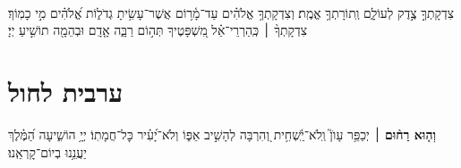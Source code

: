 \documentclass[twoside, openany, parskip=half, 11pt]{book}
\begin{document}
\tachanunim

\\
צִדְקָתְךָ֣ צֶ֣דֶק לְעוֹלָ֑ם וְֽתוֹרָתְךָ֥ אֱמֶֽת׃ וְצִדְקָתְךָ֥ אֱלֹהִ֗ים עַד־מָ֫ר֥וֹם אֲשֶׁר־עָשִׂ֥יתָ גְדֹל֑וֹת אֱ֝לֹהִ֗ים מִ֣י כָמֽוֹךָ׃ צִדְקָתְךָ֨ ׀ כְּֽהַרְרֵי־אֵ֗ל מִ֭שְׁפָּטֶיךָ תְּה֣וֹם רַבָּ֑ה אָ֤דָֽם וּבְהֵמָ֖ה תוֹשִׁ֣יעַ יְיָ׃

\fullkaddish

\aleinu





%
\chapter[ערבית לחול]{ ערבית לחול }

\textbf{וְה֤וּא רַח֨וּם}
׀ יְכַפֵּ֥ר עָוֺן֮ וְֽלֹא־יַֽ֫שְׁחִ֥ית וְ֭הִרְבָּה לְהָשִׁ֣יב אַפּ֑וֹ וְלֹא־יָ֝עִ֗יר כׇּל־חֲמָתֽוֹ׃
יְיָ֥ הוֹשִׁ֑יעָה הַ֝מֶּ֗לֶךְ יַעֲנֵ֥נוּ בְיוֹם־קׇרְאֵֽנוּ׃


\barachu


\hamaarivaravim

\ahavasolam

\shema

\veahavta

\vehaya

\vayomer{}

\newcommand{\barukhbayom}{}

\newcommand{\yerueinnu}{

\firstword{יִרְאוּ}
עֵינֵֽינוּ וְיִשְׂמַח לִבֵּֽנוּ וְתָגֵל נַפְשֵֽׁנוּ בִּישׁוּעָתְךָ בֶּאֱמֶת בֶּאֱמֹר לְצִיּוֹן מָלַךְ אֱלֹהָֽיִךְ׃
\melekhmalakhyimlokh
כִּי הַמַּלְכוּת שֶׁלְּךָ הִיא וּלְעֽוֹלְמֵי עַד תִּמְלֹךְ בְּכָבוֹד כִּי אֵין לָֽנוּ מֶֽלֶךְ אֶלָּא אַֽתָּה׃
}
\end{document}
